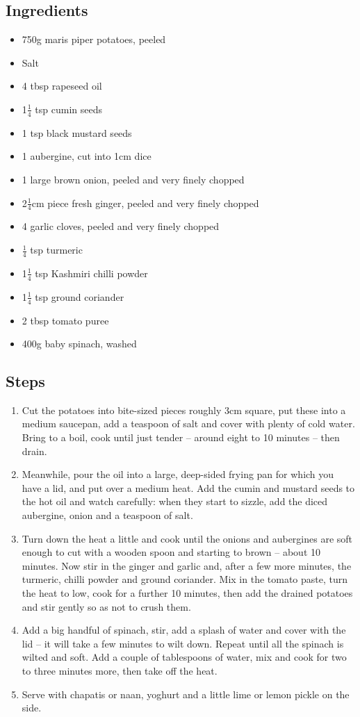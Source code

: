 \documentclass{book}
\begin{document}
\subsection*{Ingredients}
\begin{itemize}
\item 750g maris piper potatoes, peeled
\item Salt
\item 4 tbsp rapeseed oil
\item 1$\frac{1}{4}$ tsp cumin seeds 
\item 1 tsp black mustard seeds 
\item 1 aubergine, cut into 1cm dice
\item 1 large brown onion, peeled and very finely chopped
\item 2$\frac{1}{4}$cm piece fresh ginger, peeled and very finely chopped 
\item 4 garlic cloves, peeled and very finely chopped
\item $\frac{1}{4}$ tsp turmeric
\item 1$\frac{1}{4}$ tsp Kashmiri chilli powder 
\item 1$\frac{1}{4}$ tsp ground coriander 
\item 2 tbsp tomato puree 
\item 400g baby spinach, washed
\end{itemize}

\subsection*{Steps}
\begin{enumerate}
\item Cut the potatoes into bite-sized pieces roughly 3cm square, put these into a medium saucepan, add a teaspoon of salt and cover with plenty of cold water. Bring to a boil, cook until just tender – around eight to 10 minutes – then drain.
\item Meanwhile, pour the oil into a large, deep-sided frying pan for which you have a lid, and put over a medium heat. Add the cumin and mustard seeds to the hot oil and watch carefully: when they start to sizzle, add the diced aubergine, onion and a teaspoon of salt.
\item Turn down the heat a little and cook until the onions and aubergines are soft enough to cut with a wooden spoon and starting to brown – about 10 minutes. Now stir in the ginger and garlic and, after a few more minutes, the turmeric, chilli powder and ground coriander. Mix in the tomato paste, turn the heat to low, cook for a further 10 minutes, then add the drained potatoes and stir gently so as not to crush them.
\item Add a big handful of spinach, stir, add a splash of water and cover with the lid – it will take a few minutes to wilt down. Repeat until all the spinach is wilted and soft. Add a couple of tablespoons of water, mix and cook for two to three minutes more, then take off the heat.
\item Serve with chapatis or naan, yoghurt and a little lime or lemon pickle on the side.
\end{enumerate}
\newpage
\end{document}

